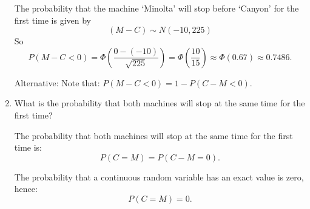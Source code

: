 \documentclass[12pt,thmsa]{article}
\begin{document}
\begin{enumerate}
The probability that the machine `Minolta' will stop before `Canyon' for the first time is given by $$(M-C)\sim N(-10,225)$$ 
So
\[
P(M-C<0)=\Phi\left(\frac{0-(-10)}{\sqrt{225}}\right)=\Phi\left(\frac{10}{15}\right)\approx\Phi(0.67) \approx 0.7486.
\]

\medskip

Alternative: Note that: $P(M - C < 0)=1-P(C-M<0)$.
\item What is the probability that both machines will stop at the same time for the first time?

The probability that both machines will stop at the same time for the first time is: $$P(C=M)=P(C-M=0).$$

The probability that a continuous random variable has an exact value is zero, hence: $$P(C=M)=0.$$



\end{enumerate}
\end{document}
